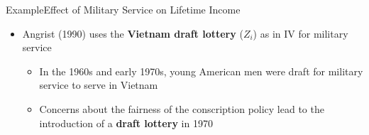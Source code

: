 \documentclass[dvipsnames,hyperref={pdfpagelabels=false}]{beamer}
\begin{document}
\begin{frame}{Example}{Effect of Military Service on Lifetime Income}
	
	\begin{itemize}
		\item Angrist (1990) uses the \textbf{Vietnam draft lottery} ($Z_{i}$) as in IV for military service
		\vspace{0.3cm} 
			\begin{itemize}
		\item In the 1960s and early 1970s, young American men were draft for military service to serve in Vietnam
		\vspace{0.3cm} 
		\item Concerns about the fairness of the conscription policy lead to the introduction of a \textbf{draft lottery} in 1970
			\end{itemize}
		
		
		
	\end{itemize}
\end{frame}
\end{document}

